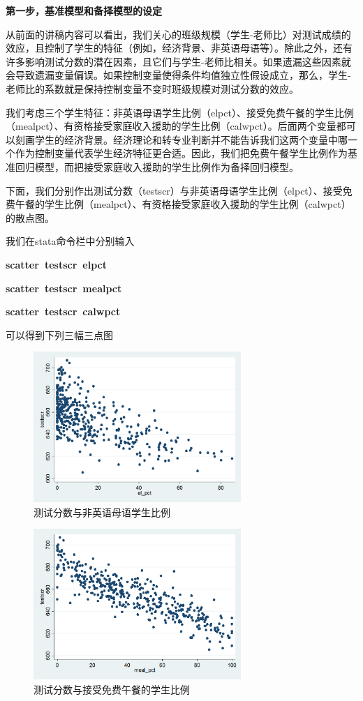 \documentclass[cn,10pt,math=newtx,citestyle=gb7714-2015,bibstyle=gb7714-2015]{elegantbook}
\begin{document}
	\textbf{第一步，基准模型和备择模型的设定}
	
	从前面的讲稿内容可以看出，我们关心的班级规模（学生-老师比）对测试成绩的效应，且控制了学生的特征（例如，经济背景、非英语母语等）。除此之外，还有许多影响测试分数的潜在因素，且它们与学生-老师比相关。如果遗漏这些因素就会导致遗漏变量偏误。如果控制变量使得条件均值独立性假设成立，那么，学生-老师比的系数就是保持控制变量不变时班级规模对测试分数的效应。
	
	我们考虑三个学生特征：非英语母语学生比例（elpct）、接受免费午餐的学生比例（mealpct）、有资格接受家庭收入援助的学生比例（calwpct）。后面两个变量都可以刻画学生的经济背景。经济理论和转专业判断并不能告诉我们这两个变量中哪一个作为控制变量代表学生经济特征更合适。因此，我们把免费午餐学生比例作为基准回归模型，而把接受家庭收入援助的学生比例作为备择回归模型。
	
	下面，我们分别作出测试分数（testscr）与非英语母语学生比例（elpct）、接受免费午餐的学生比例（mealpct）、有资格接受家庭收入援助的学生比例（calwpct）的散点图。
	
	我们在stata命令栏中分别输入
	
	\textbf{ scatter~testscr~elpct}
	
	\textbf{ scatter~testscr~mealpct}
	
	\textbf{ scatter~testscr~calwpct}
	
	可以得到下列三幅三点图
	\begin{figure}[htbp]
		\centering
		\includegraphics[width=0.7\textwidth]{elr.png}
		\caption{测试分数与非英语母语学生比例}\label{fig:digit}
	\end{figure}
	
	\begin{figure}[htbp]
		\centering
		\includegraphics[width=0.7\textwidth]{lunch.png}
		\caption{测试分数与接受免费午餐的学生比例}\label{fig:digit}
	\end{figure}
	
\end{document}

